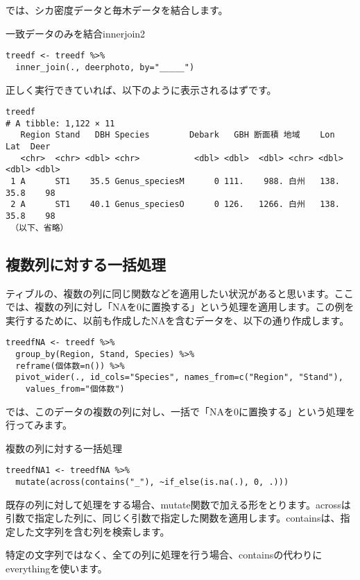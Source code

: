 では、シカ密度データと毎木データを結合します。
\begin{exercise}{一致データのみを結合}{innerjoin2}
\begin{verbatim}
treedf <- treedf %>%
  inner_join(., deerphoto, by="_____")
\end{verbatim}
\end{exercise}

正しく実行できていれば、以下のように表示されるはずです。
\begin{verbatim}
treedf
# A tibble: 1,122 × 11
   Region Stand   DBH Species        Debark   GBH 断面積 地域    Lon   Lat  Deer
   <chr>  <chr> <dbl> <chr>           <dbl> <dbl>  <dbl> <chr> <dbl> <dbl> <dbl>
 1 A      ST1    35.5 Genus_speciesM      0 111.    988. 白州   138.  35.8    98
 2 A      ST1    40.1 Genus_speciesO      0 126.   1266. 白州   138.  35.8    98
 （以下、省略）
\end{verbatim}

  \subsection{複数列に対する一括処理}
ティブルの、複数の列に同じ関数などを適用したい状況があると思います。ここでは、複数の列に対し「NAを0に置換する」という処理を適用します。この例を実行するために、以前も作成したNAを含むデータを、以下の通り作成します。
\begin{verbatim}
treedfNA <- treedf %>%
  group_by(Region, Stand, Species) %>%
  reframe(個体数=n()) %>%
  pivot_wider(., id_cols="Species", names_from=c("Region", "Stand"),
    values_from="個体数")
\end{verbatim}

では、このデータの複数の列に対し、一括で「NAを0に置換する」という処理を行ってみます。

\begin{itembox}[l]{複数の列に対する一括処理}
\begin{verbatim}
treedfNA1 <- treedfNA %>%
  mutate(across(contains("_"), ~if_else(is.na(.), 0, .)))
\end{verbatim}
\end{itembox}

既存の列に対して処理をする場合、mutate関数で加える形をとります。acrossは引数で指定した列に、同じく引数で指定した関数を適用します。containsは、指定した文字列を含む列を検索します。

特定の文字列ではなく、全ての列に処理を行う場合、containsの代わりにeverythingを使います。

